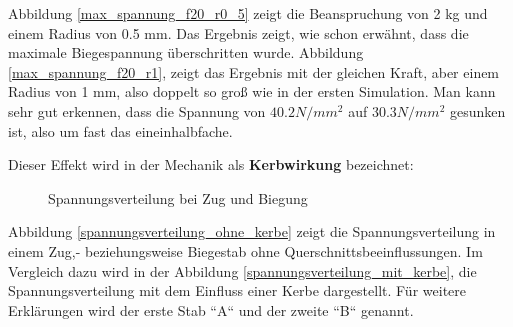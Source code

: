 	Abbildung \ref{max_spannung_f20_r0_5} zeigt die Beanspruchung von 2 kg und einem Radius von 0.5 mm.
	Das Ergebnis zeigt, wie schon erwähnt, dass die maximale Biegespannung überschritten wurde.
	Abbildung \ref{max_spannung_f20_r1}, zeigt das Ergebnis mit der gleichen Kraft, aber einem Radius von 1 mm, also doppelt so groß wie in der ersten Simulation.
	Man kann sehr gut erkennen, dass die Spannung von $40.2 N/mm^{2}$ auf $30.3 N/mm^{2}$ gesunken ist, also um fast das eineinhalbfache.

	Dieser Effekt wird in der Mechanik als \textbf{Kerbwirkung} bezeichnet:

			\begin{figure}[H]
				\begin{centering}
				\par\end{centering}
				\caption[Spannungsverteilung bei Zug und Biegung]{Spannungsverteilung bei Zug und Biegung\cite{spannungsverteilung}}
				\label{spannungsverteilung_ohne_und_mit_kerbe}
			\end{figure}

	Abbildung \ref{spannungsverteilung_ohne_kerbe} zeigt die Spannungsverteilung in einem Zug,- beziehungsweise Biegestab ohne Querschnittsbeeinflussungen.
	Im Vergleich dazu wird in der Abbildung \ref{spannungsverteilung_mit_kerbe}, die Spannungsverteilung mit dem Einfluss einer Kerbe dargestellt.
	Für weitere Erklärungen wird der erste Stab “A“ und der zweite “B“ genannt.

